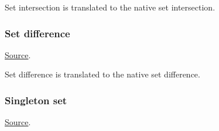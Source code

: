 
\begin{mathpar}
\end{mathpar}
Set intersection is translated to the \tlap{} native set intersection.

\subsubsection{Set difference}
\href{https://github.com/saltiniroberto/ssf/blob/7ea6e18093d9da3154b4e396dd435549f687e6b9/high_level/common/pythonic_code_generic.py#L46-L47}{Source}.



\begin{mathpar}
\end{mathpar}
Set difference is translated to the \tlap{} native set difference.

\subsubsection{Singleton set}
\href{https://github.com/saltiniroberto/ssf/blob/7ea6e18093d9da3154b4e396dd435549f687e6b9/high_level/common/pythonic_code_generic.py#L50-L51}{Source}.


